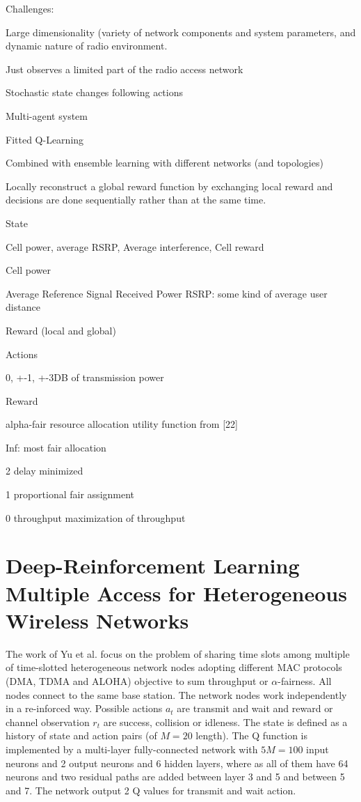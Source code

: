     Challenges: 

    Large dimensionality (variety of network components and system parameters, and dynamic nature of radio environment. 

    Just observes a limited part of the radio access network 

    Stochastic state changes following actions 

    Multi-agent system 

    Fitted Q-Learning 

    Combined with ensemble learning with different networks (and topologies) 

    Locally reconstruct a global reward function by exchanging local reward and decisions are done sequentially rather than at the same time. 

    State 

    {Cell power, average RSRP, Average interference, Cell reward} 

    Cell power 

    Average Reference Signal Received Power RSRP: some kind of average user distance 

    Reward (local and global) 

    Actions 

    0, +-1, +-3DB of transmission power 

    Reward 

    alpha-fair resource allocation utility function from [22] 

    Inf: most fair allocation 

    2 delay minimized 

    1 proportional fair assignment 

    0 throughput maximization of throughput 
\fi

\section{Deep-Reinforcement Learning Multiple Access for Heterogeneous Wireless Networks	\cite{Yu2017}}
The work of Yu et al. focus on the problem of sharing time slots among multiple of time-slotted heterogeneous network nodes adopting different MAC protocols (DMA, TDMA and ALOHA) objective to sum throughput or $\alpha$-fairness. All nodes connect to the same base station. The network nodes work independently in a re-inforced way. Possible actions $a_t$ are transmit and wait and reward or channel observation $r_t$ are success, collision or idleness. The state is defined as a history of state and action pairs (of $M=20$ length). The Q function is implemented by a multi-layer fully-connected network with $5M=100$ input neurons and 2 output neurons and 6 hidden layers, where as all of them have 64 neurons and two residual paths are added between layer 3 and 5 and between 5 and 7. The network output 2 Q values for transmit and wait action.


